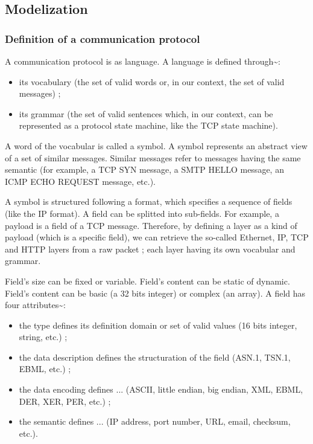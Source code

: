 \documentclass[letterpaper,10pt,english]{sphinxmanual}
\begin{document}
\subsection{Modelization}
\label{modelization/index::doc}\label{modelization/index:modelization}\label{modelization/index:id1}

\subsubsection{Definition of a communication protocol}
\label{modelization/index:definition-of-a-communication-protocol}
A communication protocol is as language. A language is defined
through\textasciitilde{}:
\begin{itemize}
\item {} 
its vocabulary (the set of valid words or, in our context, the set
of valid messages) ;

\item {} 
its grammar (the set of valid sentences which, in our context, can
be represented as a protocol state machine, like the TCP state
machine).

\end{itemize}

A word of the vocabular is called a symbol. A symbol represents an
abstract view of a set of similar messages. Similar messages refer to
messages having the same semantic (for example, a TCP SYN message, a
SMTP HELLO message, an ICMP ECHO REQUEST message, etc.).

A symbol is structured following a format, which specifies a sequence
of fields (like the IP format). A field can be splitted into
sub-fields. For example, a payload is a field of a TCP
message. Therefore, by defining a layer as a kind of payload (which is
a specific field), we can retrieve the so-called Ethernet, IP, TCP and
HTTP layers from a raw packet ; each layer having its own vocabular
and grammar.

Field's size can be fixed or variable.
Field's content can be static of dynamic.
Field's content can be basic (a 32 bits integer) or complex (an array).
A field has four attributes\textasciitilde{}:
\begin{itemize}
\item {} 
the type defines its definition domain or set of valid values (16 bits integer, string, etc.) ;

\item {} 
the data description defines the structuration of the field (ASN.1, TSN.1, EBML, etc.) ;

\item {} 
the data encoding defines ... (ASCII, little endian, big endian, XML, EBML, DER, XER, PER, etc.) ;

\item {} 
the semantic defines ... (IP address, port number, URL, email, checksum, etc.).

\end{itemize}
\end{document}
